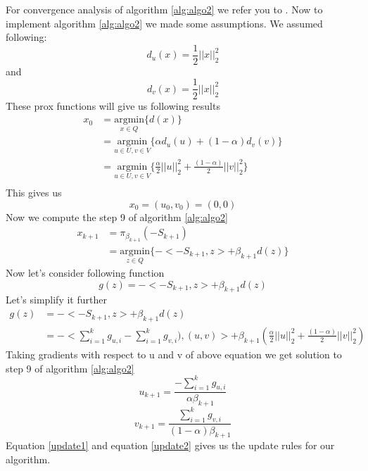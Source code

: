 \documentclass{article}
\begin{document}
For convergence analysis of algorithm \ref{alg:algo2} we refer you to \cite{nesterov_primal-dual_2009}.
\newline
Now to implement algorithm \ref{alg:algo2} we made some assumptions. We assumed following:
\begin{equation}
d_u(x)=\frac{1}{2}||x||_2^2
\end{equation}
and
\begin{equation}
d_v(x)=\frac{1}{2}||x||_2^2
\end{equation}
These prox functions will give us following results
\begin{align*}
x_0 &= \underset{x \in Q}{\text{argmin}} \{ d(x)\}\\
&=\underset{u \in U,v \in V}{\text{argmin}} \{ \alpha d_u(u)+(1-\alpha)d_v(v)\}\\
&=\underset{u \in U,v \in V}{\text{argmin}} \{ \frac{ \alpha}{2}||u||_2^2+\frac{(1-\alpha)}{2}||v||_2^2\}\\
\end{align*}
This gives us $$x_0=(u_0,v_0)=(0,0)$$
Now we compute the step 9 of algorithm \ref{alg:algo2}
\begin{align*}
x_{k+1}&=\pi_{\beta_{k+1}}(-S_{k+1})\\
&=\underset{z \in Q}{\text{argmin}} \{ -<-S_{k+1},z>+\beta_{k+1}d(z)\}
\end{align*}
Now let's consider following function
\begin{equation}
g(z)=-<-S_{k+1},z>+\beta_{k+1}d(z)
\end{equation}
Let's simplify it further
\begin{align*}
g(z)&=-<-S_{k+1},z>+\beta_{k+1}d(z)\\
&=-<\sum_{i=1}^k g_{u,i}-\sum_{i=1}^k g_{v,i}),(u,v)>+\beta_{k+1}(\frac{ \alpha}{2}||u||_2^2+\frac{(1-\alpha)}{2}||v||_2^2)
\end{align*}
Taking gradients with respect to u and v of above equation we get solution to step 9 of algorithm \ref{alg:algo2}
\begin{equation}\label{update1}
u_{k+1}=\frac{-\sum_{i=1}^k g_{u,i}}{\alpha \beta_{k+1}}
\end{equation}
\begin{equation}\label{update2}
v_{k+1}=\frac{\sum_{i=1}^k g_{v,i}}{(1-\alpha) \beta_{k+1}}
\end{equation}
Equation \ref{update1} and  equation \ref{update2} gives us the update rules for our algorithm.
\end{document}
